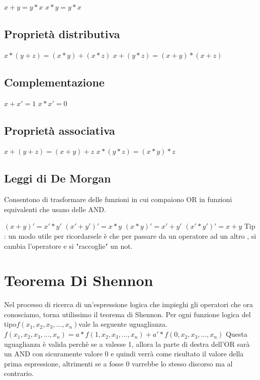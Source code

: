 \documentclass[a4paper]{book}
\begin{document}
\(x+y=y*x \) \newline
\(x*y=y*x \) 

\subsection*{Proprietà distributiva}

\( x*(y+z)=(x*y)+(x*z)  \) \newline
\( x+(y*z)=(x+y)*(x+z)  \)

\subsection*{Complementazione}

\(x+x'=1 \) \newline
\(x*x'=0 \)

\subsection*{Proprietà associativa}

\(x+(y+z)=(x+y)+z \) \newline
\(x*(y*z)=(x*y)*z \) 

\subsection*{Leggi di De Morgan}

Consentono di trasformare delle funzioni in cui compaiono OR in funzioni equivalenti che usano delle AND.

\( (x+y)' = x' * y' \) \hspace{3cm} \( (x'+y')' = x*y\) \newline
\( (x*y)' = x' + y' \) \hspace{3cm} \( (x'*y')'= x+y\)
\newline
Tip : un modo utile per ricordarsele è che per passare da un operatore ad un altro , si cambia l'operatore e si "raccoglie" un not.

\newpage
\section{Teorema Di Shennon}
Nel processo di ricerca di un'espressione logica che impieghi gli operatori che ora conosciamo, torna utilissimo il teorema di Shennon.
Per ogni funzione logica del tipo\break\newline \( f({x_1},{x_2},{x_3},...,{x_n}) \)\break\newline vale la seguente uguaglianza.\newline \(f({x_1},{x_2},{x_3},...,{x_n})=a*f(1,{x_2},{x_3},...,{x_n})+a'*f(0,{x_2},{x_3},...,{x_n})\)\break\newline
Questa uguaglianza è valida perchè se a valesse 1, allora la parte di destra dell'OR sarà un AND con sicuramente valore 0 e quindi verrà come risultato il valore della prima espressione, altrimenti se a fosse 0 varrebbe lo stesso discorso ma al contrario.
\end{document}
